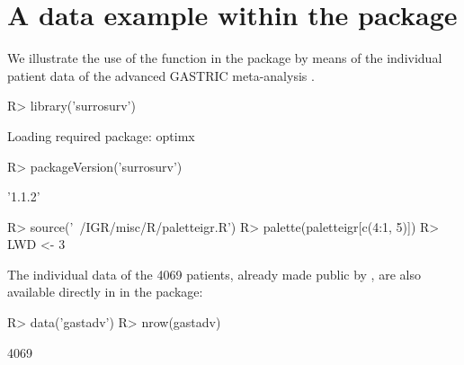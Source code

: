 \documentclass[article,shortnames, nojss]{jss}\usepackage[]{graphicx}\usepackage[]{color}
\begin{document}
\section[A data example within the surrosurv package]{A data example within the  package}
We illustrate the use of the function in the  package
by means of the individual patient data of the advanced GASTRIC meta-analysis
\citep{GASTRIC13, Paoletti2013}.
\begin{Schunk}
\begin{Sinput}
R> library('surrosurv')
\end{Sinput}
\begin{Soutput}
Loading required package: optimx
\end{Soutput}
\begin{Sinput}
R> packageVersion('surrosurv')
\end{Sinput}
\begin{Soutput}
[1] '1.1.2'
\end{Soutput}
\begin{Sinput}
R> source('~/IGR/misc/R/paletteigr.R')
R> palette(paletteigr[c(4:1, 5)])
R> LWD <- 3
\end{Sinput}
\end{Schunk}

The individual data of the 4069 patients,
already made public by \cite{BuyseEtal15},
are also available directly in  in the  package:
\begin{Schunk}
\begin{Sinput}
R> data('gastadv')
R> nrow(gastadv)
\end{Sinput}
\begin{Soutput}
[1] 4069
\end{Soutput}
\end{Schunk}
\end{document}
